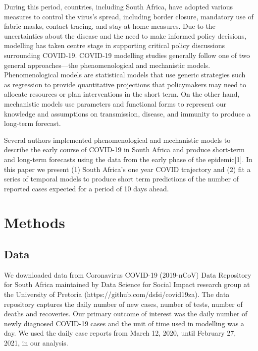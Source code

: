 \documentclass[10pt,letterpaper]{article}
\begin{document}
During this period, countries, including South Africa, have adopted various measures to control the virus's spread, including border closure, mandatory use of fabric masks, contact tracing, and stay-at-home measures. Due to the uncertainties about the disease and the need to make informed policy decisions, modelling has taken centre stage in supporting critical policy discussions surrounding COVID-19. COVID-19 modelling studies generally follow one of two general approaches—the phenomenological and mechanistic models. Phenomenological models are statistical models that use generic strategies such as regression to provide quantitative projections that policymakers may need to allocate resources or plan interventions in the short term. On the other hand, mechanistic models use parameters and functional forms to represent our knowledge and assumptions on transmission, disease, and immunity to produce a long-term forecast. 

Several authors implemented phenomenological and mechanistic models to describe the early course of COVID-19 in South Africa and produce short-term and long-term forecasts using the data from the early phase of the epidemic{[}1{]}. In this paper we present (1) South Africa's one year COVID trajectory and (2) fit a series of temporal models to produce short term predictions of the number of reported cases expected for a period of 10 days ahead. 


\hypertarget{methods}{%
\section{Methods}\label{methods}}

\hypertarget{data}{%
\subsection{Data}\label{data}}

We downloaded data from Coronavirus COVID-19 (2019-nCoV) Data Repository
for South Africa maintained by Data Science for Social Impact research
group at the University of Pretoria (https://github.com/dsfsi/covid19za). The data repository
captures the daily number of new cases, number of tests, number of
deaths and recoveries. Our primary outcome of interest was the daily
number of newly diagnosed COVID-19 cases and the unit of time used in
modelling was a day. We used the daily case reports from March 12, 2020,
until February 27, 2021, in our analysis.
\end{document}

